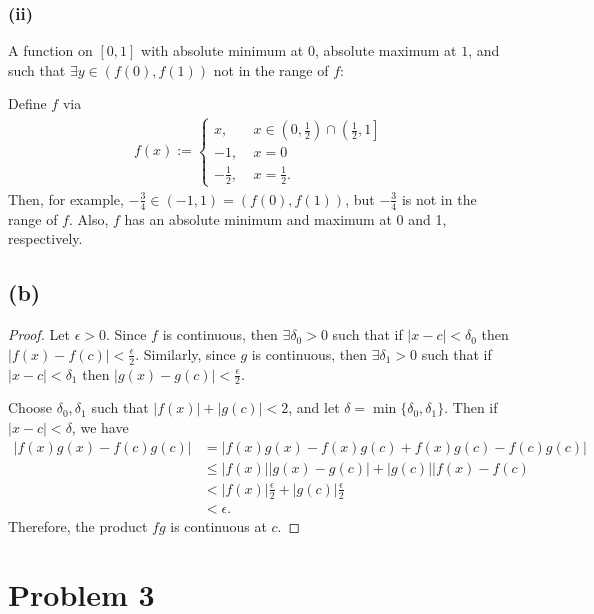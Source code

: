 \documentclass{article}
\begin{document}
\subsubsection*{(ii)}
A function on $[0, 1]$ with absolute minimum at $0$, absolute maximum at $1$, and such that $\exists y \in (f(0), f(1))$ not in the range of $f$:

Define $f$ via
\begin{align}
	f(x) := 
	\begin{cases}
		x, \quad &x \in \left(0, \frac{1}{2}\right) \cap \left(\frac{1}{2}, 1\right] \\
		-1, &x = 0 \\
		-\frac{1}{2}, &x = \frac{1}{2}.
	\end{cases}
\end{align}
Then, for example, $-\frac{3}{4} \in (-1, 1) = \left(f(0), f(1)\right)$, but $-\frac{3}{4}$ is not in the range of $f$. Also, $f$ has an absolute minimum and maximum at 0 and 1, respectively. 

\subsection*{(b)}
\begin{proof}
	Let $\epsilon > 0$. Since $f$ is continuous, then $\exists \delta_0 > 0$ such that if $|x - c| < \delta_0$ then $|f(x) - f(c)| < \frac{\epsilon}{2}$. Similarly, since $g$ is continuous, then $\exists \delta_1 > 0$ such that if $|x - c| < \delta_1$ then $|g(x) - g(c)| < \frac{\epsilon}{2}$. 
	
	Choose $\delta_0, \delta_1$ such that $|f(x)| + |g(c)| < 2$, and let $\delta = \min\{\delta_0, \delta_1\}$. Then if $|x - c| < \delta$, we have
	\begin{align}
		|f(x)g(x) - f(c)g(c)| &= |f(x)g(x) - f(x)g(c) + f(x)g(c) - f(c)g(c)| \\
		&\leq |f(x)||g(x) - g(c)| + |g(c)||f(x) - f(c) \\
		&< |f(x)|\frac{\epsilon}{2} + |g(c)|\frac{\epsilon}{2} \\
		&< \epsilon.
	\end{align} 
	Therefore, the product $fg$ is continuous at $c$. 
\end{proof}
\section*{Problem 3}
\end{document}
